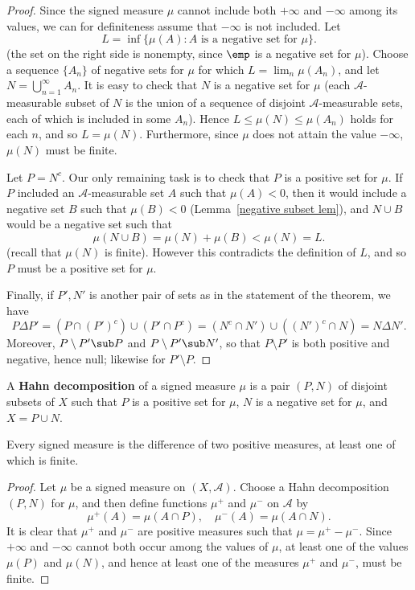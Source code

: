 \begin{proof}
Since the signed measure $\mu$ cannot include both $+\infty$ and $-\infty$ among its values, we can for definiteness assume that $-\infty$ is not included. Let
\[L=\inf\{\mu(A):\text{$A$ is a negative set for $\mu$}\}.\]
(the set on the right side is nonempty, since $\emp$ is a negative set for $\mu$). Choose a sequence $\{A_n\}$ of negative sets for $\mu$ for which $L=\lim_n\mu(A_n)$, and let $N=\bigcup_{n=1}^{\infty}A_n$. It is easy to check that $N$ is a negative set for $\mu$ (each $\mathcal{A}$-measurable subset of $N$ is the union of a sequence of disjoint $\mathcal{A}$-measurable sets, each of which is included in some $A_n$). Hence $L\leq\mu(N)\leq\mu(A_n)$ holds for each $n$, and so $L=\mu(N)$. Furthermore, since $\mu$ does not attain the value $-\infty$, $\mu(N)$ must be finite.\par
Let $P=N^c$. Our only remaining task is to check that $P$ is a positive set for $\mu$. If $P$ included an $\mathcal{A}$-measurable set $A$ such that $\mu(A)<0$, then it would include a negative set $B$ such that $\mu(B)<0$ (Lemma~\ref{negative subset lem}), and $N\cup B$ would be a negative set such that
\[\mu(N\cup B)=\mu(N)+\mu(B)<\mu(N)=L.\]
(recall that $\mu(N)$ is finite). However this contradicts the definition of $L$, and so $P$ must be a positive set for $\mu$.\par
Finally, if $P',N'$ is another pair of sets as in the statement of the theorem, we have 
\[P\Delta P'=(P\cap (P')^c)\cup(P'\cap P^c)=(N^c\cap N')\cup((N')^c\cap N)=N\Delta N'.\]
Moreover, $P\setminus P'\sub P$ and $P\setminus P'\sub N'$, so that $P\setminus P'$ is both positive and negative, hence null; likewise for $P'\setminus P$.
\end{proof}
A \textbf{Hahn decomposition} of a signed measure $\mu$ is a pair $(P,N)$ of disjoint subsets of $X$ such that $P$ is a positive set for $\mu$, $N$ is a negative set for $\mu$, and $X=P\cup N$.
\begin{theorem}\label{Jordan decomposition}
Every signed measure is the difference of two positive measures, at least one of which is finite.
\end{theorem}
\begin{proof}
Let $\mu$ be a signed measure on $(X,\mathcal{A})$. Choose a Hahn decomposition $(P,N)$ for $\mu$, and then define functions $\mu^+$ and $\mu^-$ on $\mathcal{A}$ by
\[\mu^+(A)=\mu(A\cap P),\quad \mu^-(A)=\mu(A\cap N).\]
It is clear that $\mu^+$ and $\mu^-$ are positive measures such that $\mu=\mu^+-\mu^-$. Since $+\infty$ and $-\infty$ cannot both occur among the values of $\mu$, at least one of the values $\mu(P)$ and $\mu(N)$, and hence at least one of the measures $\mu^+$ and $\mu^-$, must be finite.
\end{proof}
